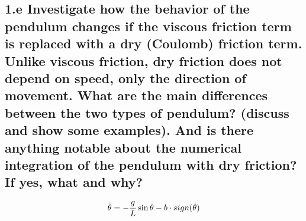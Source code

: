 \documentclass{cmc}
\begin{document}
\subsection*{1.e Investigate how the behavior of the pendulum changes if the
  viscous friction term is replaced with a dry (Coulomb) friction term. Unlike
  viscous friction, dry friction does not depend on speed, only the direction of
  movement. What are the main differences between the two types of pendulum?
  (discuss and show some examples). And is there anything notable about the
  numerical integration of the pendulum with dry friction? If yes, what and why?}

\begin{equation}
  \label{eq:ode-pendulum-dry}
  \ddot{\theta} = - {g \over L} \sin \theta - b \cdot sign(\dot{\theta})
\end{equation}
\end{document}
